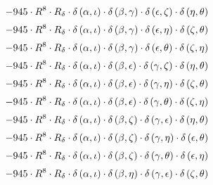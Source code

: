 \begin{subequations}
\begin{gather}
 \\[0.2em] \notag 		 - 945 \cdot R^{8} \cdot R_{\delta{}} \cdot \delta{}\left(\alpha{}, \iota{}\right) \cdot \delta{}\left(\beta{}, \gamma{}\right) \cdot \delta{}\left(\epsilon{}, \zeta{}\right) \cdot \delta{}\left(\eta{}, \theta{}\right) 
 \\[0.2em] \notag 		 - 945 \cdot R^{8} \cdot R_{\delta{}} \cdot \delta{}\left(\alpha{}, \iota{}\right) \cdot \delta{}\left(\beta{}, \gamma{}\right) \cdot \delta{}\left(\epsilon{}, \eta{}\right) \cdot \delta{}\left(\zeta{}, \theta{}\right) 
 \\[0.2em] \notag 		 - 945 \cdot R^{8} \cdot R_{\delta{}} \cdot \delta{}\left(\alpha{}, \iota{}\right) \cdot \delta{}\left(\beta{}, \gamma{}\right) \cdot \delta{}\left(\epsilon{}, \theta{}\right) \cdot \delta{}\left(\zeta{}, \eta{}\right) 
 \\[0.2em] \notag 		 - 945 \cdot R^{8} \cdot R_{\delta{}} \cdot \delta{}\left(\alpha{}, \iota{}\right) \cdot \delta{}\left(\beta{}, \epsilon{}\right) \cdot \delta{}\left(\gamma{}, \zeta{}\right) \cdot \delta{}\left(\eta{}, \theta{}\right) 
 \\[0.2em] \notag 		 - 945 \cdot R^{8} \cdot R_{\delta{}} \cdot \delta{}\left(\alpha{}, \iota{}\right) \cdot \delta{}\left(\beta{}, \epsilon{}\right) \cdot \delta{}\left(\gamma{}, \eta{}\right) \cdot \delta{}\left(\zeta{}, \theta{}\right) 
 \\[0.2em] \notag 		 - 945 \cdot R^{8} \cdot R_{\delta{}} \cdot \delta{}\left(\alpha{}, \iota{}\right) \cdot \delta{}\left(\beta{}, \epsilon{}\right) \cdot \delta{}\left(\gamma{}, \theta{}\right) \cdot \delta{}\left(\zeta{}, \eta{}\right) 
 \\[0.2em] \notag 		 - 945 \cdot R^{8} \cdot R_{\delta{}} \cdot \delta{}\left(\alpha{}, \iota{}\right) \cdot \delta{}\left(\beta{}, \zeta{}\right) \cdot \delta{}\left(\gamma{}, \epsilon{}\right) \cdot \delta{}\left(\eta{}, \theta{}\right) 
 \\[0.2em] \notag 		 - 945 \cdot R^{8} \cdot R_{\delta{}} \cdot \delta{}\left(\alpha{}, \iota{}\right) \cdot \delta{}\left(\beta{}, \zeta{}\right) \cdot \delta{}\left(\gamma{}, \eta{}\right) \cdot \delta{}\left(\epsilon{}, \theta{}\right) 
 \\[0.2em] \notag 		 - 945 \cdot R^{8} \cdot R_{\delta{}} \cdot \delta{}\left(\alpha{}, \iota{}\right) \cdot \delta{}\left(\beta{}, \zeta{}\right) \cdot \delta{}\left(\gamma{}, \theta{}\right) \cdot \delta{}\left(\epsilon{}, \eta{}\right) 
 \\[0.2em] \notag 		 - 945 \cdot R^{8} \cdot R_{\delta{}} \cdot \delta{}\left(\alpha{}, \iota{}\right) \cdot \delta{}\left(\beta{}, \eta{}\right) \cdot \delta{}\left(\gamma{}, \epsilon{}\right) \cdot \delta{}\left(\zeta{}, \theta{}\right) 

\end{gather}
\end{subequations}
